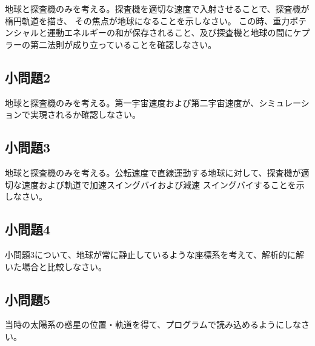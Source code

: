\documentclass{article}
\begin{document}
地球と探査機のみを考える。探査機を適切な速度で入射させることで、探査機が楕円軌道を描き、
その焦点が地球になることを示しなさい。
この時、重力ポテンシャルと運動エネルギーの和が保存されること、及び探査機と地球の間にケプラーの第二法則が成り立っていることを確認しなさい。

\subsection{ 小問題2 }

地球と探査機のみを考える。第一宇宙速度および第二宇宙速度が、シミュレーションで実現されるか確認しなさい。

\subsection{ 小問題3 }

地球と探査機のみを考える。公転速度で直線運動する地球に対して、探査機が適切な速度および軌道で加速スイングバイおよび減速
スイングバイすることを示しなさい。

\subsection{ 小問題4 }

小問題3について、地球が常に静止しているような座標系を考えて、解析的に解いた場合と比較しなさい。

\subsection{ 小問題5 }

当時の太陽系の惑星の位置・軌道を得て、プログラムで読み込めるようにしなさい。
\end{document}
